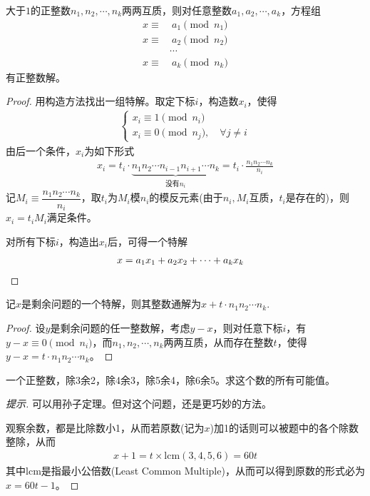 \begin{theorem}
  大于$1$的正整数$n_1,n_2,\cdots, n_k$两两互质，则对任意整数$a_1,a_2,\cdots,a_k$，方程组
  \begin{align*}
    x\equiv&\ a_1\pmod{n_1}\\
    x\equiv&\ a_2\pmod{n_2}\\
    &\cdots\\
    x\equiv&\ a_k\pmod{n_k}
  \end{align*}
  有正整数解。  
\end{theorem}
\begin{proof}
  用构造方法找出一组特解。取定下标$i$，构造数$x_i$，使得
  \begin{align*}
    \begin{cases}
      x_i\equiv1\pmod{n_i}\\
      x_i\equiv0\pmod{n_j}, \quad\forall j\ne i
    \end{cases}
  \end{align*}
  由后一个条件，$x_i$为如下形式
  \begin{align*}
    x_i=t_i\cdot \underbrace{n_1n_2\cdots n_{i-1}n_{i+1}\cdots n_k}_{\text{没有}n_i}=t_i\cdot \frac{n_1n_2 \cdots n_k}{n_i}
  \end{align*}
  记$M_i\equiv\dfrac{n_1n_2\cdots n_k}{n_i}$，取$t_i$为$M_i$模$n_i$的模反元素(由于$n_i,M_i$互质，$t_i$是存在的)，则$x_i=t_iM_i$满足条件。

  对所有下标$i$，构造出$x_i$后，可得一个特解
  \begin{align*}
    x=a_1x_1+a_2x_2+\cdots+a_kx_k&\qedhere
  \end{align*}
\end{proof}

\begin{theorem}
  记$x$是剩余问题的一个特解，则其整数通解为$x+t\cdot n_1n_2\cdots n_k$.
\end{theorem}
\begin{proof}
  设$y$是剩余问题的任一整数解，考虑$y-x$，则对任意下标$i$，有$y-x\equiv0\pmod{n_i}$，而$n_1,n_2,\cdots,n_k$两两互质，从而存在整数$t$，使得$y-x=t\cdot n_1n_2\cdots n_k$。
\end{proof}

\begin{example}
  一个正整数，除3余2，除4余3，除5余4，除6余5。求这个数的所有可能值。
\end{example}
\begin{proof}[提示]
  可以用孙子定理。但对这个问题，还是更巧妙的方法。

  观察余数，都是比除数小1，从而若原数(记为$x$)加1的话则可以被题中的各个除数整除，从而
  \begin{align*}
    x+1=t\times \mathrm{lcm}(3,4,5,6) = 60t
  \end{align*}
  其中$\mathrm{lcm}$是指最小公倍数(Least Common Multiple)，从而可以得到原数的形式必为$x=60t - 1$。
\end{proof}